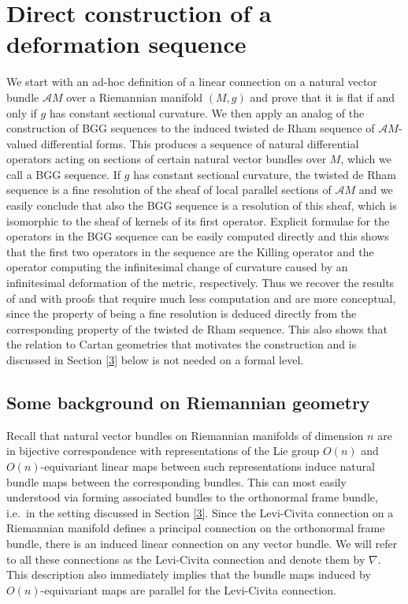 \documentclass[12pt,a4paper]{amsart}
\def\Cal{\mathcal}
\numberwithin{theorem}{section}
\numberwithin{equation}{section}
\theoremstyle{definition}
\theoremstyle{remark}
\begin{document}
\section{Direct construction of a deformation sequence}\label{2}
We start with an ad-hoc definition of a linear connection on a natural vector bundle
$\Cal AM$ over a Riemannian manifold $(M,g)$ and prove that it is flat if and only if
$g$ has constant sectional curvature. We then apply an analog of the construction of
BGG sequences to the induced twisted de Rham sequence of $\Cal AM$-valued
differential forms. This produces a sequence of natural differential operators acting
on sections of certain natural vector bundles over $M$, which we call a BGG
sequence. If $g$ has constant sectional curvature, the twisted de Rham sequence is a
fine resolution of the sheaf of local parallel sections of $\Cal AM$ and we easily
conclude that also the BGG sequence is a resolution of this sheaf, which is
isomorphic to the sheaf of kernels of its first operator. Explicit formulae for the
operators in the BGG sequence can be easily computed directly and this shows that the
first two operators in the sequence are the Killing operator and the operator
computing the infinitesimal change of curvature caused by an infinitesimal
deformation of the metric, respectively. Thus we recover the results of \cite{Calabi}
and \cite{BBL} with proofs that require much less computation and are more
conceptual, since the property of being a fine resolution is deduced directly from
the corresponding property of the twisted de Rham sequence. This also shows that the
relation to Cartan geometries that motivates the construction and is discussed in
Section \ref{3} below is not needed on a formal level.

\subsection{Some background on Riemannian geometry}\label{2.1}
Recall that natural vector bundles on Riemannian manifolds of dimension $n$ are in
bijective correspondence with representations of the Lie group $O(n)$ and
$O(n)$-equivariant linear maps between such representations induce natural bundle
maps between the corresponding bundles. This can most easily understood via forming
associated bundles to the orthonormal frame bundle, i.e.\ in the setting discussed in
Section \ref{3}. Since the Levi-Civita connection on a Riemannian manifold defines a
principal connection on the orthonormal frame bundle, there is an induced linear
connection on any vector bundle. We will refer to all these connections as the
Levi-Civita connection and denote them by $\nabla$. This description also immediately
implies that the bundle maps induced by $O(n)$-equivariant maps are parallel for the
Levi-Civita connection.
\end{document}
